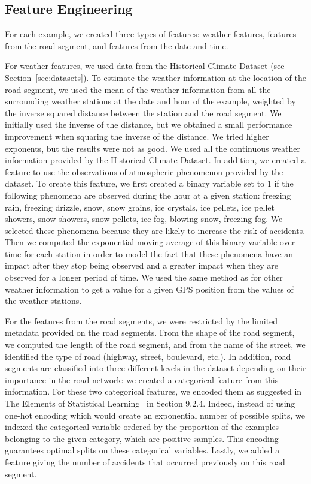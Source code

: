 \documentclass[conference]{IEEEtran}
\begin{document}
\subsection{Feature Engineering}

For each example, we created three types of features: weather features,
features from the road segment, and features from the date and time.

For weather features, we used data from the Historical Climate Dataset (see Section~\ref{sec:datasets}).
To estimate the weather information at the location of the road
segment, we used the mean of the weather information from all the
surrounding weather stations at the date and hour of the example, weighted
by the inverse squared distance between the station and the
road segment. We initially used the inverse of the distance, but we
obtained a small performance improvement when squaring the inverse of
the distance. We tried higher exponents, but the results were not as good.
We used all the continuous weather information provided
by the Historical Climate Dataset. In addition, we created a feature to use
the observations of atmospheric phenomenon provided by the dataset.
To create this feature, we first created a binary variable set to 1 if the
following phenomena are observed during the hour at a given station:
freezing rain, freezing drizzle, snow, snow grains, ice crystals, ice pellets,
ice pellet showers, snow showers, snow pellets, ice fog, blowing snow, freezing
fog. We selected these phenomena because they are likely to increase the risk of
accidents. Then we computed the exponential moving average of this binary
variable over time for each station in order to model the fact that
these phenomena have an impact after they stop being observed and a greater
impact when they are observed for a longer period of time.
We used the same method as for other weather information to get a value for a given 
GPS position from the values of the weather stations.

For the features from the road segments, we were restricted by the limited
metadata provided on the road segments. From the shape of the road segment,
we computed the length of the road segment, and from the name of the
street, we identified the type of road (highway, street, boulevard, etc.).
In addition, road segments are classified into three different levels in
the dataset depending on their importance in the road network: we created a
categorical feature from this information. For these two categorical
features, we encoded them as suggested in The Elements of Statistical
Learning~\cite{elementsofstat} in Section 9.2.4. Indeed, instead of using one-hot
encoding which would create an exponential number of possible splits, we indexed the
categorical variable ordered by the proportion of the examples belonging to
the given category, which are positive samples. This encoding guarantees 
optimal splits on these categorical variables. Lastly, we added a
feature giving the number of accidents that occurred previously on this
road segment.
\end{document}
